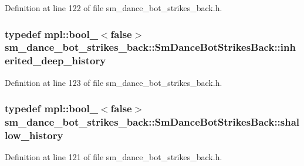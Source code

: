 Definition at line 122 of file sm\+\_\+dance\+\_\+bot\+\_\+strikes\+\_\+back.\+h.

\subsubsection[{\texorpdfstring{inherited\+\_\+deep\+\_\+history}{inherited_deep_history}}]{\setlength{\rightskip}{0pt plus 5cm}typedef mpl\+::bool\+\_\+$<$false$>$ {\bf sm\+\_\+dance\+\_\+bot\+\_\+strikes\+\_\+back\+::\+Sm\+Dance\+Bot\+Strikes\+Back\+::inherited\+\_\+deep\+\_\+history}}\hypertarget{structsm__dance__bot__strikes__back_1_1SmDanceBotStrikesBack_aca174eb9bc9f50083f00b8bb1946fb6b}{}\label{structsm__dance__bot__strikes__back_1_1SmDanceBotStrikesBack_aca174eb9bc9f50083f00b8bb1946fb6b}


Definition at line 123 of file sm\+\_\+dance\+\_\+bot\+\_\+strikes\+\_\+back.\+h.

\subsubsection[{\texorpdfstring{shallow\+\_\+history}{shallow_history}}]{\setlength{\rightskip}{0pt plus 5cm}typedef mpl\+::bool\+\_\+$<$false$>$ {\bf sm\+\_\+dance\+\_\+bot\+\_\+strikes\+\_\+back\+::\+Sm\+Dance\+Bot\+Strikes\+Back\+::shallow\+\_\+history}}\hypertarget{structsm__dance__bot__strikes__back_1_1SmDanceBotStrikesBack_a193a12436ca97e49e143e642f314656b}{}\label{structsm__dance__bot__strikes__back_1_1SmDanceBotStrikesBack_a193a12436ca97e49e143e642f314656b}


Definition at line 121 of file sm\+\_\+dance\+\_\+bot\+\_\+strikes\+\_\+back.\+h.



